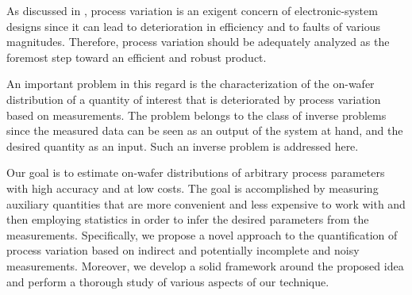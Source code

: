 As discussed in , process variation is an exigent
concern of electronic-system designs since it can lead to deterioration in
efficiency and to faults of various magnitudes. Therefore, process variation
should be adequately analyzed as the foremost step toward an efficient and
robust product.

An important problem in this regard is the characterization of the on-wafer
distribution of a quantity of interest that is deteriorated by process variation
based on measurements. The problem belongs to the class of inverse problems
since the measured data can be seen as an output of the system at hand, and the
desired quantity as an input. Such an inverse problem is addressed here.

Our goal is to estimate on-wafer distributions of arbitrary process parameters
with high accuracy and at low costs. The goal is accomplished by measuring
auxiliary quantities that are more convenient and less expensive to work with
and then employing statistics in order to infer the desired parameters from the
measurements. Specifically, we propose a novel approach to the quantification of
process variation based on indirect and potentially incomplete and noisy
measurements. Moreover, we develop a solid framework around the proposed idea
and perform a thorough study of various aspects of our technique.
